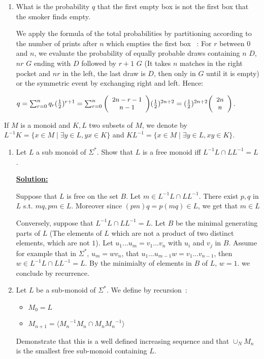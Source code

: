 \documentclass[a4paper,11pt]{exam}
\newcommand{\binomial}[2]{\small{\left(\begin{array}{c} #1 \\ #2\end{array} \right)}}
\begin{document}
\begin{questions}
\begin{enumerate}
	\item What is the probability $ q $ that the first empty box is not the first box that the smoker finds empty.
	
	\begin{solution}
		We apply the formula of the total probabilities by partitioning according to the number of prints after $ n $ which empties the first box ~:
		For $ r $ between $ 0 $ and $ n $, we evaluate the probability of equally probable draws containing $ n $ $ D $, $ nr $ $ G $ ending with $ D $ followed by $ r + 1 $ $ G $ (It takes $ n $ matches in the right pocket and $ nr $ in the left, the last draw is $ D $, then only in $ G $ until it is empty) or the symmetric event by exchanging right and left.
		Hence:
		
		$q = \sum_{r=0}^n q_r (\frac{1}{2})^{r+1} =   \sum_{r=0}^n  \binomial{2n-r-1}{n-1} (\frac{1}{2})^{2n+2}  =  (\frac{1}{2})^{2n+2} \binomial{2n}{n}$.
	\end{solution}
	
\end{enumerate}
 \question
If $M$ is a monoid and $K, L$ two subsets of $M$, we denote by  $L^{-1}K = \{ x\in M \mid \exists y \in L, yx \in K \}$ and  $KL^{-1} = \{ x\in M \mid \exists y \in L, xy \in K \}$.
\begin{enumerate}
	\item Let $L$ a sub monoid of $\Sigma^*$. Show that $L$ is a free monoid iff $L^{-1}L \cap LL^{-1}=L$.\smallskip
	
	{\bf \underline{Solution:}}
	
		Suppose that $L$ is free on the set $B$. 
		Let $m \in L^{-1}L \cap LL^{-1}$.
		There exist $p,q$ in $L$ s.t. $mq,pm \in L$.
		Moreover since $(pm)q=p(mq)\in L$, we get that $m\in L$
		
		\smallskip
		
		Conversely, suppose that $L^{-1}L \cap LL^{-1}=L$. Let $B$ be the minimal generating parts of $L$ (The elements of $L$ which are not a product of two distinct elements, which are not $1$).
		Let $u_1 \dots u_m = v_1 \dots v_n$ with $u_i$ and $v_j$ in $B$.
		Assume for example that in $\Sigma^*$, $u_m=wv_n$, that
		$u_1 \dots u_{m-1} w = v_1 \dots v_{n-1}$, then
		$w \in L^{-1}L \cap LL^{-1}=L$.
		By the minimialty of elements in $B$ of $L$, $w=1$.
		we conclude by recurrence.

	
	\item Let $L$ be a sub-monoid of $\Sigma^*$. We define by recursion~:
	\begin{itemize}
		\item $M_0 = L$
		\item $M_{n+1} = \langle {M_n}^{-1}{M_n} \cap {M_n}{M_n}^{-1} \rangle$
	\end{itemize}
	Demonstrate that this is a well defined increasing sequence and that $\cup_N M_n$ is the smallest free sub-monoid containing $L$.\smallskip
	

\end{enumerate}
\end{questions}
\end{document}
